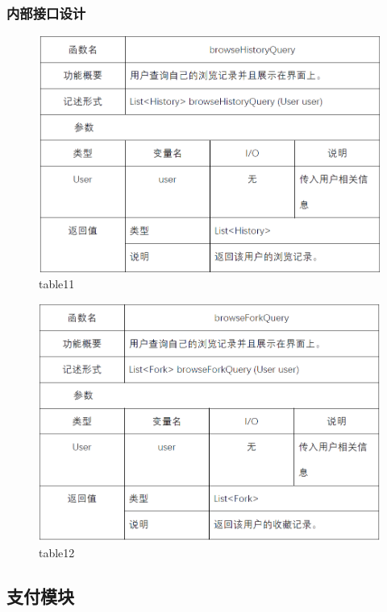 \subsubsection{内部接口设计}
\begin{figure}[!htb]
	\centering
	\includegraphics[scale=1]{image/b11.png} %
	\caption{table11} %
\end{figure}
\begin{figure}[!htb]
	\centering
	\includegraphics[scale=1]{image/b12.png} %
	\caption{table12} %
\end{figure}
\subsection{支付模块}
